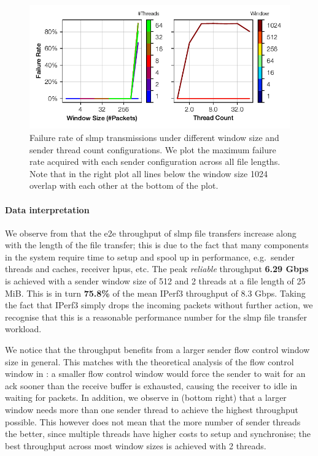 \begin{figure}[t]
    \centering
    \includegraphics{thesis/figures/slmp-loss.pdf}
    \caption{Failure rate of \ac{slmp} transmissions under different window size and sender thread count configurations.  We plot the maximum failure rate acquired with each sender configuration across all file lengths.  Note that in the right plot all lines below the window size 1024 overlap with each other at the bottom of the plot.} \label{fig:slmp-loss}
\end{figure}

\paragraph{Data interpretation} We observe from  that the \ac{e2e} throughput of \ac{slmp} file transfers increase along with the length of the file transfer; this is due to the fact that many components in the system require time to setup and spool up in performance, e.g.\ sender threads and caches, receiver \ac{hpu}s, etc.  The peak \emph{reliable} throughput \textbf{6.29 Gbps} is achieved with a sender window size of 512 and 2 threads at a file length of 25 MiB.  This is in turn \textbf{75.8\%} of the mean IPerf3 throughput of 8.3 Gbps.  Taking the fact that IPerf3 simply drops the incoming packets without further action, we recognise that this is a reasonable performance number for the \ac{slmp} file transfer workload.

We notice that the throughput benefits from a larger sender flow control window size in general.  This matches with the theoretical analysis of the flow control window in : a smaller flow control window would force the sender to wait for an \ac{ack} sooner than the receive buffer is exhausted, causing the receiver to idle in waiting for packets.  In addition, we observe in  (bottom right) that a larger window needs more than one sender thread to achieve the highest throughput possible.  This however does not mean that the more number of sender threads the better, since multiple threads have higher costs to setup and synchronise; the best throughput across most window sizes is achieved with 2 threads.

